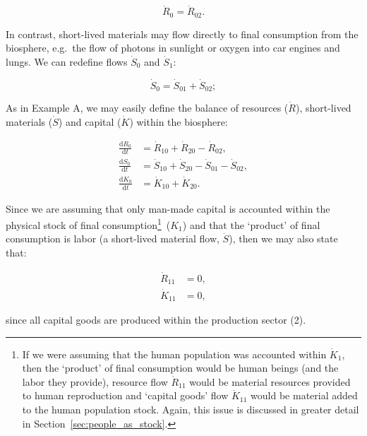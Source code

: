 \begin{equation}\label{eq:B_R0}
	\dot{R}_{0} = \dot{R}_{02}.
\end{equation}

In contrast, 
short-lived materials may flow directly to final consumption 
from the biosphere, 
e.g.\ the flow of photons in sunlight or oxygen into car engines and lungs. 
We can redefine flows $\dot{S}_{0}$ and $\dot{S}_{1}$:

\begin{equation}\label{eq:B_S0}
	\dot{S}_{0} 
	= \dot{S}_{01} + \dot{S}_{02};
\end{equation}

As in Example A, we may easily define 
the balance of resources ($\dot{R}$),
short-lived materials ($\dot{S}$) and
capital ($\dot{K}$) within the biosphere:

\begin{align}\label{eq:B_dR0}
	\frac{\mathrm{d}R_{0}}{\mathrm{d}t}	&
	= \dot{R}_{10}
	+ \dot{R}_{20}
	- \dot{R}_{02},										\\
\label{eq:B_dS0}
	\frac{\mathrm{d}S_{0}}{\mathrm{d}t}	&
	= \dot{S}_{10}
	+ \dot{S}_{20}
	- \dot{S}_{01}
	- \dot{S}_{02},										\\	
\label{eq:B_dK0}
	\frac{\mathrm{d}K_{0}}{\mathrm{d}t}	&
	= \dot{K}_{10}
	+ \dot{K}_{20}.
\end{align}

Since we are assuming that only man-made capital
is accounted within the physical stock of final consumption\footnote{If
we were assuming that the human population
was accounted within $\dot{K}_{1}$,
then the `product' of final consumption would be human beings
(and the labor they provide),
resource flow $\dot{R}_{11}$ would be material resources
provided to human reproduction and
`capital goods' flow $\dot{K}_{11}$ would be material
added to the human population stock. Again, 
this issue is discussed in greater detail in 
Section~\ref{sec:people_as_stock}.}~($K_{1}$)
and that the `product' of final consumption is labor
(a short-lived material flow, $\dot{S}$),
then we may also state that:

\begin{align}\label{eq:B_R11_K11}
	\dot{R}_{11}				& 
	= 0,								\\
	\dot{K}_{11}				& 
	= 0,
\end{align}

\noindent{}since all capital goods are produced within
the production sector (2).


